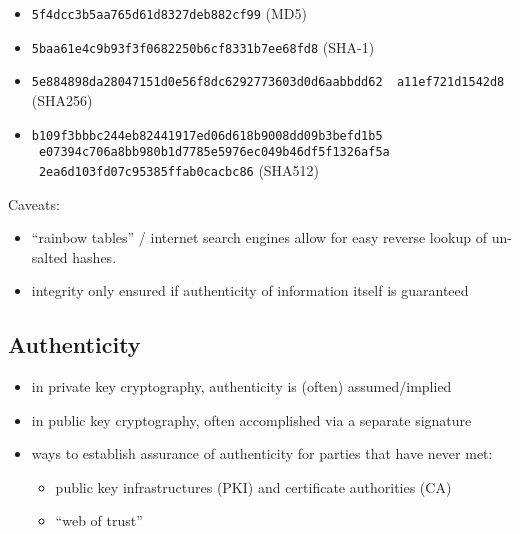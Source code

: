 \documentclass[xga]{xdvislides}
\begin{document}
\begin{itemize}
	\item {\tt 5f4dcc3b5aa765d61d8327deb882cf99} (MD5)
	\item {\tt 5baa61e4c9b93f3f0682250b6cf8331b7ee68fd8} (SHA-1)
	\item {\tt 5e884898da28047151d0e56f8dc6292773603d0d6aabbdd62 \
                   a11ef721d1542d8} (SHA256)
	\item {\tt b109f3bbbc244eb82441917ed06d618b9008dd09b3befd1b5 \
                   e07394c706a8bb980b1d7785e5976ec049b46df5f1326af5a \
                   2ea6d103fd07c95385ffab0cacbc86} (SHA512)
\end{itemize}


Caveats:
\begin{itemize}
	\item ``rainbow tables'' / internet search engines allow for easy reverse
		lookup of un-salted hashes.
	\item integrity only ensured if authenticity of information itself is
		guaranteed
\end{itemize}

%
\subsection{Authenticity}
\begin{itemize}
	\item in private key cryptography, authenticity is (often) assumed/implied
	\item in public key cryptography, often accomplished via a separate
		signature
	\item ways to establish assurance of authenticity for parties that have
		never met:
		\begin{itemize}
			\item public key infrastructures (PKI) and certificate
				authorities (CA)
			\item ``web of trust''
		\end{itemize}
\end{itemize}
\end{document}
